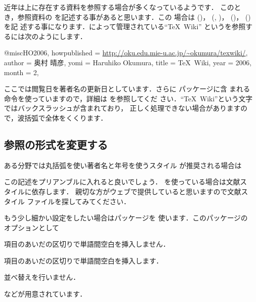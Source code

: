 \label{exe:url}
近年は上に存在する資料を参照する場合が多くなっているようです．
このとき，参照資料の  を記述する事があると思います．この
場合は  ()， (,
)， ()， ()を記
述する事になります．によって管理されている``\TeX~Wiki''
というを参照するには次のようにします．

\begin{intext}
@misc{HO2006,
 howpublished = {\url{http://oku.edu.mie-u.ac.jp/~okumura/texwiki/}}, 
 author    = {奥村 晴彦}, 
 yomi      = {Haruhiko Okumura},
 title     = {{\TeX\ Wiki}},
 year      = 2006, 
 month     = 2,
}   
\end{intext}

ここでは閲覧日を著者名の更新日としています．さらに パッケージに含
まれる  命令を使っていますので，詳細は を参照してくだ
さい．``\TeX~Wiki''という文字ではバックスラッシュが含まれており，
正しく処理できない場合がありますので，波括弧で全体をくくります．


\subsection{参照の形式を変更する}
ある分野では丸括弧を使い著者名と年号を使うスタイル
が推奨される場合は

\begin{intext}
\makeatletter
\renewcommand{\@cite}[2]{（{#1\if@tempswa , #2\fi}）}
\renewcommand{\@biblabel}[1]{（#1）} 
\makeatother
\end{intext}

この記述をプリアンブルに入れると良いでしょう．
{\JBibTeX}を使っている場合は文献スタイルに依存します．
親切な方がウェブで提供していると思いますので文献スタイル
ファイルを探してみてください．

もう少し細かい設定をしたい場合はパッケージを
使います．このパッケージのオプションとして
\begin{description}
%
 \item[\Option{nospace}] 項目のあいだの区切りで単語間空白を挿入しません．
 \item[\Option{space}] 項目のあいだの区切りで単語間空白を挿入します．
 \item[\Option{nosort}] 並べ替えを行いません．
\end{description}
などが用意されています．

